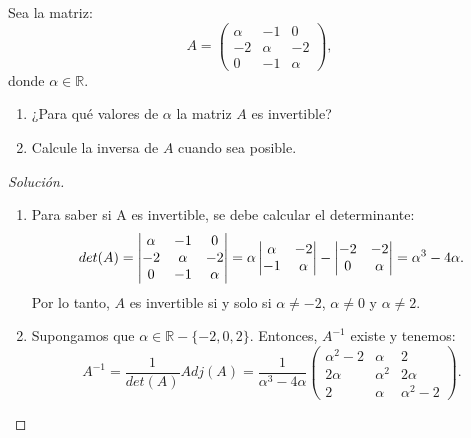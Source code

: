 \documentclass[a4,11pt]{aleph-notas}
\begin{document}
\begin{ejer}
    Sea la matriz:
    \[
        A= \begin{pmatrix}
            \alpha & -1 & 0 \\
            -2 & \alpha & -2 \\
            0 & -1 & \alpha
        \end{pmatrix},
    \]
    donde $\alpha \in \mathbb{R}$.
    \begin{enumerate}
    \item 
        ¿Para qu\'{e} valores de $\alpha$ la matriz $A$ es invertible? 
    \item 
        Calcule la inversa de $A$ cuando sea posible.
    \end{enumerate}
\end{ejer}

\begin{proof}[Solución]\hspace{0pt}
    \begin{enumerate}
    \item 
    Para saber si A es invertible, se debe calcular el determinante: 
    \[
    det(A)=\begin{vmatrix}
                \alpha & -1 & 0 \\
                -2 & \alpha & -2 \\
                0 & -1 & \alpha
                \end{vmatrix}=\alpha \begin{vmatrix}
                \alpha & -2 \\
                -1 & \alpha
                \end{vmatrix}-\begin{vmatrix}
                -2 & -2 \\
                0 & \alpha
                \end{vmatrix}=\alpha^3-4\alpha.\\
    \]
    Por lo tanto, $A$ es invertible si y solo si $\alpha \neq-2$, $\alpha\neq0$ y $\alpha\neq2$.
    
    \item Supongamos que $\alpha \in \mathbb{R}-\{-2, 0, 2\}$. Entonces, $A^{-1}$ existe y tenemos:
    \[
    A^{-1}=\frac{1}{det(A)}Adj(A)=\frac{1}{\alpha^3-4\alpha}   \begin{pmatrix}
                \alpha^2-2 & \alpha & 2 \\
                2\alpha & \alpha^2 & 2\alpha \\
                2 & \alpha & \alpha^2-2
            \end{pmatrix}.
    \]
    \end{enumerate}
\end{proof}
\end{document}
